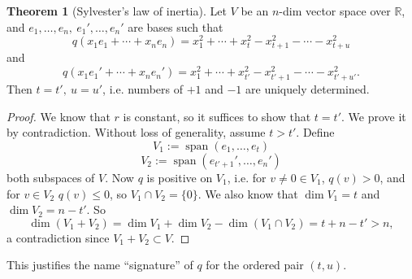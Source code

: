 \documentclass[a4paper]{article}
\newcommand{\spanset}{\operatorname{span}}
\theoremstyle{definition}
\newtheorem{thm}[defn]{Theorem}
\begin{document}
\begin{thm}[Sylvester's law of inertia]
Let $V$ be an $n$-dim vector space over $\mathbb R$, and $e_1,\ldots,e_n,\ e_1',\ldots,e_n'$ are bases such that
\[
q(x_1e_1+\cdots+x_ne_n)=x_1^2+\cdots+x_t^2-x_{t+1}^2-\cdots-x_{t+u}^2
\]
and
\[
q(x_1e_1'+\cdots+x_ne_n')=x_1^2+\cdots+x_{t'}^2-x_{t'+1}^2-\cdots-x_{t'+u'}^2 .
\]
Then $t=t',\ u=u'$, i.e. numbers of $+1$ and $-1$ are uniquely determined.
\end{thm}
\begin{proof}
We know that $r$ is constant, so it suffices to show that $t=t'$. We prove it by contradiction. Without loss of generality, assume $t>t'$. Define
    \[
    V_1:=\spanset (e_1,\ldots,e_t)
    \]
    \[
    V_2:=\spanset \left(e_{t'+1}',\ldots,e_n'\right)
    \]
    both subspaces of $V$. Now $q$ is positive on $V_1$, i.e. for $v\neq 0\in V_1$, $q(v)>0$, and for $v\in V_2$ $q(v)\leq 0$, so $V_1 \cap V_2=\{0\}$. We also know that $\dim V_1=t$ and $\dim V_2=n-t'$. So
    \[
    \dim (V_1+V_2)= \dim V_1+\dim V_2-\dim (V_1 \cap V_2)=t+n-t'>n ,
    \]
    a contradiction since $V_1+V_2 \subset V$.
\end{proof}
This justifies the name ``signature'' of $q$ for the ordered pair $(t,u)$.
\end{document}
